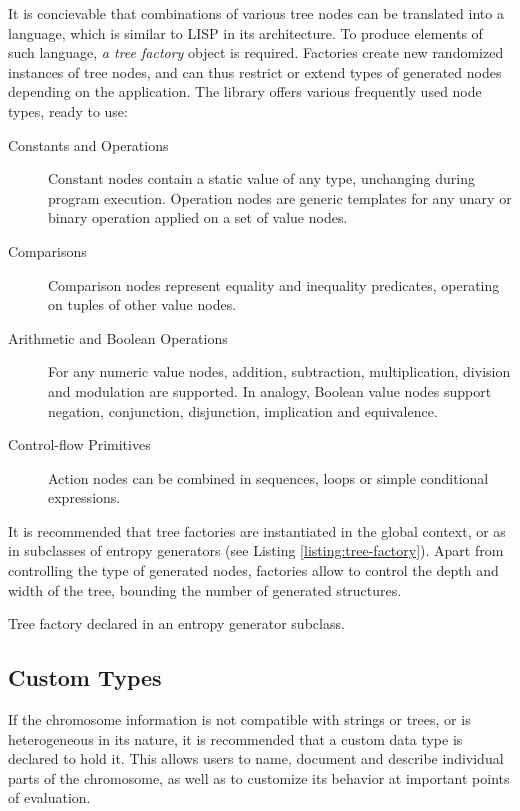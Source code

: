 It is concievable that combinations of various tree nodes can be translated into a language, which is similar to LISP in its architecture. To produce elements of such language, \textit{a tree factory} object is required. Factories create new randomized instances of tree nodes, and can thus restrict or extend types of generated nodes depending on the application. The library offers various frequently used node types, ready to use:
~
\begin{description}
	\item[Constants and Operations]
	Constant nodes contain a static value of any type, unchanging during program execution. Operation nodes are generic templates for any unary or binary operation applied on a set of value nodes.

	\item[Comparisons]
	Comparison nodes represent equality and inequality predicates, operating on tuples of other value nodes.

	\item[Arithmetic and Boolean Operations]
	For any numeric value nodes, addition, subtraction, multiplication, division and modulation are supported. In analogy, Boolean value nodes support negation, conjunction, disjunction, implication and equivalence.

	\item[Control-flow Primitives]
	Action nodes can be combined in sequences, loops or simple conditional expressions.
\end{description}

It is recommended that tree factories are instantiated in the global context, or as in subclasses of entropy generators (see Listing \ref{listing:tree-factory}). Apart from controlling the type of generated nodes, factories allow to control the depth and width of the tree, bounding the number of generated structures.

\begin{listing}[ht]
	\caption{Tree factory declared in an entropy generator subclass.}
	\label{listing:tree-factory}
\end{listing}

\subsection{Custom Types}\label{section:custom-types}
If the chromosome information is not compatible with strings or trees, or is heterogeneous in its nature, it is recommended that a custom data type is declared to hold it. This allows users to name, document and describe individual parts of the chromosome, as well as to customize its behavior at important points of evaluation.

